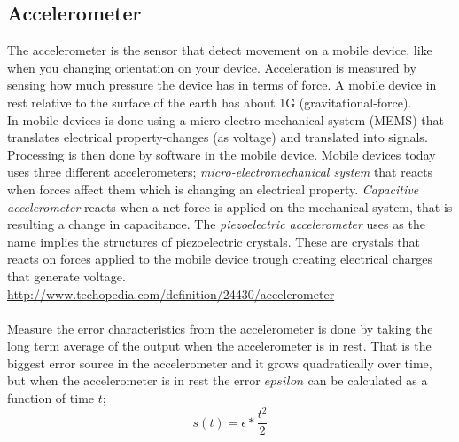 \subsection{Accelerometer}\label{sec:accelerometer}
The accelerometer is the sensor that detect movement on a mobile device, like when you changing orientation on your device. Acceleration is measured by sensing how much pressure the device has in terms of force. A mobile device in rest relative to the surface of the earth has about 1G (gravitational-force). \cite[]{sensors:allref}\\
In mobile devices is done using a micro-electro-mechanical system (MEMS) that translates electrical property-changes (as voltage) and translated into signals. Processing is then done by software in the mobile device. Mobile devices today uses three different accelerometers; \textit{micro-electromechanical system} that reacts when forces affect them which is changing an electrical property. \textit{Capacitive accelerometer} reacts when a net force is applied on the mechanical system, that is resulting a change in capacitance. The \textit{piezoelectric accelerometer} uses as the name implies the structures of piezoelectric crystals. These are crystals that reacts on forces applied to the mobile device trough creating electrical charges that generate voltage. 
\url{http://www.techopedia.com/definition/24430/accelerometer} \\
\\
Measure the error characteristics from the accelerometer is done by taking the long term average of the output when the accelerometer is in rest. That is the biggest error source in the accelerometer and it grows quadratically over time, but when the accelerometer is in rest the error $epsilon$ can be calculated as a function of time $t$;
$$s(t)=\epsilon * \frac{t^2}{2} $$
\cite[]{sensor:inertialNav}\\
\\


